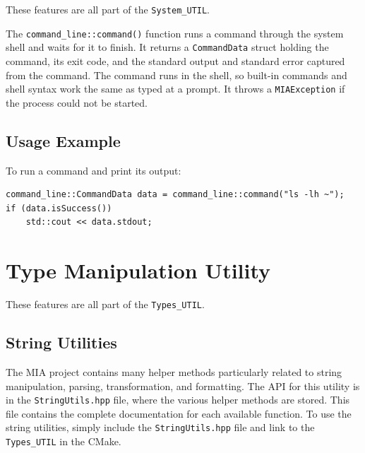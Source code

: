 These features are all part of the \texttt{System\_UTIL}.

The \texttt{command\_line::command()} function runs a command through the system shell and waits for it to finish. It returns a \texttt{CommandData} struct holding the command, its exit code, and the standard output and standard error captured from the command. The command runs in the shell, so built-in commands and shell syntax work the same as typed at a prompt. It throws a \texttt{MIAException} if the process could not be started.

\subsection{Usage Example}
To run a command and print its output:
\begin{lstlisting}[style=cppstyle]
command_line::CommandData data = command_line::command("ls -lh ~");
if (data.isSuccess())
    std::cout << data.stdout;
\end{lstlisting}










\section{Type Manipulation Utility}\label{section:type_utils}

These features are all part of the \texttt{Types\_UTIL}.


\subsection{String Utilities}\label{section:string_utils}

The MIA project contains many helper methods particularly related to string manipulation, parsing, transformation, and formatting. The API for this utility is in the \texttt{StringUtils.hpp} file, where the various helper methods are stored. This file contains the complete documentation for each available function. To use the string utilities, simply include the \texttt{StringUtils.hpp} file and link to the \texttt{Types\_UTIL} in the CMake.

